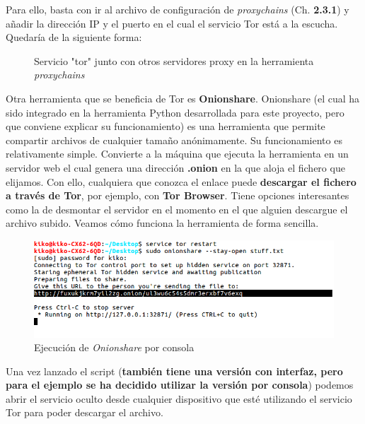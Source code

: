 Para  ello, basta con ir al archivo de configuración de \textit{proxychains} (Ch. \textbf{2.3.1}) y añadir la dirección IP y el puerto en el cual el servicio Tor está a la escucha. Quedaría de la siguiente forma:
\begin{figure}[H]
	\caption{Servicio "tor" junto con otros servidores proxy en la herramienta \textit{proxychains}}
	\label{fig:norm_Daugman}
\end{figure} 
Otra herramienta que se beneficia de Tor es \textbf{Onionshare}. 
Onionshare (el cual ha sido integrado en la herramienta Python desarrollada para este proyecto, pero que conviene explicar su funcionamiento) es una herramienta que permite compartir archivos de cualquier tamaño anónimamente. Su funcionamiento es relativamente simple. Convierte a la máquina que ejecuta la herramienta en un servidor web el cual genera una dirección \textbf{.onion} en la que aloja el fichero que elijamos. 
Con ello, cualquiera que conozca el enlace puede \textbf{descargar el fichero a través de Tor}, por ejemplo, con \textbf{Tor Browser}. 
Tiene opciones interesantes como la de desmontar el servidor en el momento en el que alguien descargue el archivo subido. Veamos cómo funciona la herramienta de forma sencilla.

\begin{figure}[h]
	\centerline{
		\mbox{\includegraphics[width=5.00in]{images/onionshare1.png}}
	}
	\caption{Ejecución de \textit{Onionshare} por consola}
	\label{fig:onionshare}
\end{figure} 

Una vez lanzado el script (\textbf{también tiene una versión con interfaz, pero para el ejemplo se ha decidido utilizar la versión por consola}) podemos abrir el servicio oculto desde cualquier dispositivo que esté utilizando el servicio Tor para poder descargar el archivo.

